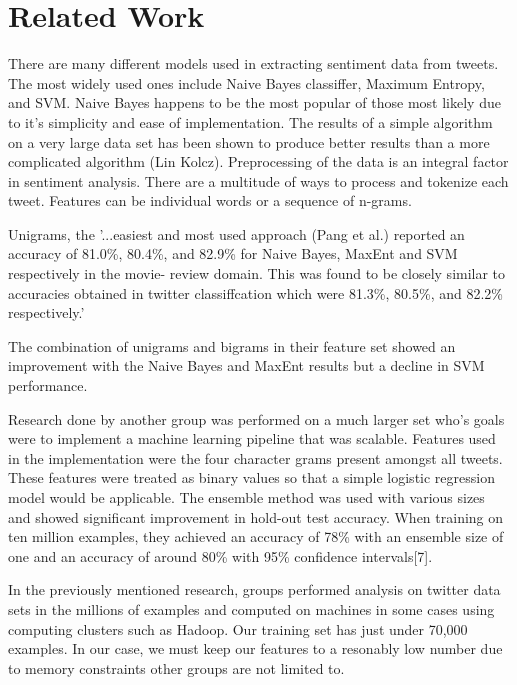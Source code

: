 \documentclass{article}
\begin{document}

\section{Related Work}
There are many different models used in extracting sentiment data from tweets. The most widely used ones include Naive Bayes classiffer, Maximum Entropy, and SVM. Naive Bayes happens to be the most popular of those most likely due to it's simplicity and ease of implementation. The results of a simple algorithm on a very large data set has been shown to produce better results than a more complicated algorithm (Lin Kolcz). Preprocessing of the data is an integral factor in sentiment analysis. There are a multitude of ways to process and tokenize each tweet. Features can be individual words or a sequence of n-grams. 

Unigrams, the '...easiest and most used approach (Pang et al.) reported an accuracy of 81.0\%, 80.4\%, and 82.9\% for Naive Bayes, MaxEnt and SVM respectively in the movie- review domain. This was found to be closely similar to accuracies obtained in twitter classiffcation which were 81.3\%, 80.5\%, and 82.2\% respectively.'

The combination of unigrams and bigrams in their feature set showed an improvement with the Naive Bayes and MaxEnt results but a decline in SVM performance. 

Research done by another group was performed on a much larger set who's goals were to implement a machine learning pipeline that was scalable. Features used in the implementation were the four character grams present amongst all tweets. These features were treated as binary values so that a simple logistic regression model would be applicable. The ensemble method was used with various sizes and showed significant improvement in hold-out test accuracy. When training on ten million examples, they achieved an accuracy of 78\% with an ensemble size of one and an accuracy of around 80\% with 95\% confidence intervals[7].

In the previously mentioned research, groups performed analysis on twitter data sets in the millions of examples and computed on machines in some cases using computing clusters such as Hadoop. Our training set has just under 70,000 examples. In our case, we must keep our features to a resonably low number due to memory constraints other groups are not limited to.
\end{document}
